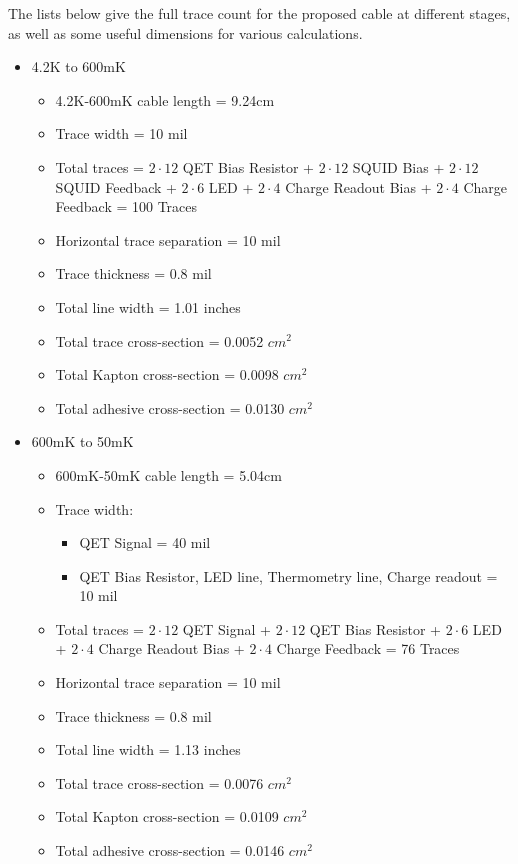 \documentclass{report}
\begin{document}
The lists below give the full trace count for the proposed cable at different stages, as well as some useful dimensions for various calculations.

\begin{itemize}
\item 4.2K to 600mK
    \begin{itemize}
    \item 4.2K-600mK cable length = 9.24cm
    \item Trace width = 10 mil
    \item Total traces = $2\cdot12$ QET Bias Resistor + $2\cdot12$ SQUID Bias + $2\cdot12$ SQUID Feedback + $2\cdot6$ LED + $2\cdot4$ Charge Readout Bias + $2\cdot4$ Charge Feedback = 100 Traces
    \item Horizontal trace separation = 10 mil
    \item Trace thickness = 0.8 mil
    \item Total line width = 1.01 inches
    \item Total trace cross-section = 0.0052 $cm^2$
    \item Total Kapton cross-section = 0.0098 $cm^2$
    \item Total adhesive cross-section = 0.0130 $cm^2$
    \end{itemize}
\item 600mK to 50mK
    \begin{itemize}
    \item 600mK-50mK cable length = 5.04cm
    \item Trace width:
        \begin{itemize}
        \item QET Signal = 40 mil
        \item QET Bias Resistor, LED line, Thermometry line, Charge readout = 10 mil
        \end{itemize}
    \item Total traces = $2\cdot12$ QET Signal + $2\cdot12$ QET Bias Resistor + $2\cdot6$ LED + $2\cdot4$ Charge Readout Bias + $2\cdot4$ Charge Feedback = 76 Traces
    \item Horizontal trace separation = 10 mil
    \item Trace thickness = 0.8 mil
    \item Total line width = 1.13 inches
    \item Total trace cross-section = 0.0076 $cm^2$
    \item Total Kapton cross-section = 0.0109 $cm^2$
    \item Total adhesive cross-section = 0.0146 $cm^2$
    \end{itemize}
\end{itemize}
\end{document}
